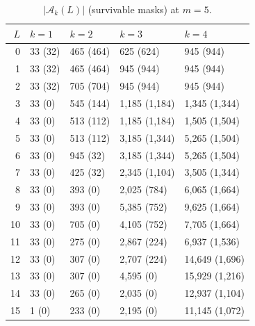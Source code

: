 \documentclass[11pt,a4paper]{article}
\theoremstyle{plain}
\theoremstyle{definition}
\theoremstyle{remark}
\newcommand{\calA}{\mathcal{A}}
\begin{document}
\begin{table}[H]\centering\small
\caption{$|\calA_k(L)|$ (survivable masks) at $m=5$.}\label{tab:S6a5}
\begin{tabular}{rllll}
\toprule
$L$ & $k=1$ & $k=2$ & $k=3$ & $k=4$\\
\midrule
0 & 33 (32) & 465 (464) & 625 (624) & 945 (944)\\
1 & 33 (32) & 465 (464) & 945 (944) & 945 (944)\\
2 & 33 (32) & 705 (704) & 945 (944) & 945 (944)\\
3 & 33 (0) & 545 (144) & 1{,}185 (1{,}184) & 1{,}345 (1{,}344)\\
4 & 33 (0) & 513 (112) & 1{,}185 (1{,}184) & 1{,}505 (1{,}504)\\
5 & 33 (0) & 513 (112) & 3{,}185 (1{,}344) & 5{,}265 (1{,}504)\\
6 & 33 (0) & 945 (32) & 3{,}185 (1{,}344) & 5{,}265 (1{,}504)\\
7 & 33 (0) & 425 (32) & 2{,}345 (1{,}104) & 3{,}505 (1{,}344)\\
8 & 33 (0) & 393 (0) & 2{,}025 (784) & 6{,}065 (1{,}664)\\
9 & 33 (0) & 393 (0) & 5{,}385 (752) & 9{,}625 (1{,}664)\\
10 & 33 (0) & 705 (0) & 4{,}105 (752) & 7{,}705 (1{,}664)\\
11 & 33 (0) & 275 (0) & 2{,}867 (224) & 6{,}937 (1{,}536)\\
12 & 33 (0) & 307 (0) & 2{,}707 (224) & 14{,}649 (1{,}696)\\
13 & 33 (0) & 307 (0) & 4{,}595 (0) & 15{,}929 (1{,}216)\\
14 & 33 (0) & 265 (0) & 2{,}035 (0) & 12{,}937 (1{,}104)\\
15 & 1 (0) & 233 (0) & 2{,}195 (0) & 11{,}145 (1{,}072)\\
\bottomrule
\end{tabular}
\end{table}
\end{document}
